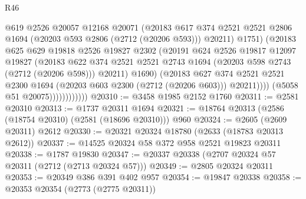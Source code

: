 \begin{lexlean}{R46}
\begin{coremodule}
                                @619
                                @2526
                                @20057
                                @12168
                                @20071
                                (@20183
                                  @617
                                  @374
                                  @2521
                                  @2521
                                  @2806
                                  @1694
                                  (@20203 @593 @2806 (@2712 (@20206 @593)))
                                  @20211)
                                @1751)
                              (@20183
                                @625
                                @629
                                @19818
                                @2526
                                @19827
                                @2302
                                (@20191
                                  @624
                                  @2526
                                  @19817
                                  @12097
                                  @19827
                                  (@20183
                                    @622
                                    @374
                                    @2521
                                    @2521
                                    @2743
                                    @1694
                                    (@20203 @598 @2743 (@2712 (@20206 @598)))
                                    @20211)
                                  @1690)
                                (@20183
                                  @627
                                  @374
                                  @2521
                                  @2521
                                  @2300
                                  @1694
                                  (@20203 @603 @2300 (@2712 (@20206 @603)))
                                  @20211))))
                          (@5058 @51 @20075))))))))))))
@20310 := @3458 @1985 @2152 @1760
@20311 := @2581 @20310
@20313 := @1737 @20311 @1694
@20321 := @18764 @20313 (@2586 (@18754 @20310) (@2581 (@18696 @20310))) @960
@20324 := @2605 (@2609 @20311) @2612
@20330 := @20321 @20324 @18780 (@2633 (@18783 @20313 @2612))
@20337 := @14525 @20324 @58 @372 @958 @2521 @19823 @20311
@20338 := @1787 @19830
@20347 := @20337 @20338 (@2707 @20324 @57 @20311 (@2712 (@2713 @20324 @57)))
@20349 := @2805 @20324 @20311
@20353 := @20349 @386 @391 @402 @957
@20354 := @19847 @20338
@20358 := @20353 @20354 (@2773 (@2775 @20311))

\end{coremodule}
\end{lexlean}
